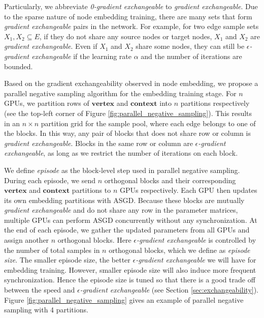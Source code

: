 \documentclass[sigconf]{acmart}
\newcommand{\mat}[1]{\mathbf{#1}}
\newcommand{\property}[1]{\textit{#1}}
\begin{document}
Particularly, we abbreviate \property{0-gradient exchangeable} to \property{gradient exchangeable}. Due to the sparse nature of node embedding training, there are many sets that form \property{gradient exchangeable} pairs in the network. For example, for two edge sample sets $X_1, X_2 \subseteq E$, if they do not share any source nodes or target nodes, $X_1$ and $X_2$ are \property{gradient exchangeable}. Even if $X_1$ and $X_2$ share some nodes, they can still be \property{$\epsilon$-gradient exchangeable} if the learning rate $\alpha$ and the number of iterations are bounded.

Based on the gradient exchangeability observed in node embedding, we propose a parallel negative sampling algorithm for the embedding training stage. For $n$ GPUs, we partition rows of $\mat{vertex}$ and $\mat{context}$ into $n$ partitions respectively (see the top-left corner of Figure \ref{fig:parallel_negative_sampling}). This results in an $n \times n$ partition grid for the sample pool, where each edge belongs to one of the blocks. In this way, any pair of blocks that does not share row or column is \property{gradient exchangeable}. Blocks in the same row or column are \property{$\epsilon$-gradient exchangeable}, as long as we restrict the number of iterations on each block.

We define \emph{episode} as the block-level step used in parallel negative sampling. During each episode, we send $n$ orthogonal blocks and their corresponding $\mat{vertex}$ and $\mat{context}$ partitions to $n$ GPUs respectively. Each GPU then updates its own embedding partitions with ASGD. Because these blocks are mutually \property{gradient exchangeable} and do not share any row in the parameter matrices, multiple GPUs can perform ASGD concurrently without any synchronization. At the end of each episode, we gather the updated parameters from all GPUs and assign another $n$ orthogonal blocks. Here \property{$\epsilon$-gradient exchangeable} is controlled by the number of total samples in $n$ orthogonal blocks, which we define as \emph{episode size}. The smaller episode size, the better \property{$\epsilon$-gradient exchangeable} we will have for embedding training. However, smaller episode size will also induce more frequent synchronization. Hence the episode size is tuned so that there is a good trade off between the speed and \property{$\epsilon$-gradient exchangeable} (see Section \ref{sec:exchangeability}). Figure \ref{fig:parallel_negative_sampling} gives an example of parallel negative sampling with 4 partitions.
\end{document}
